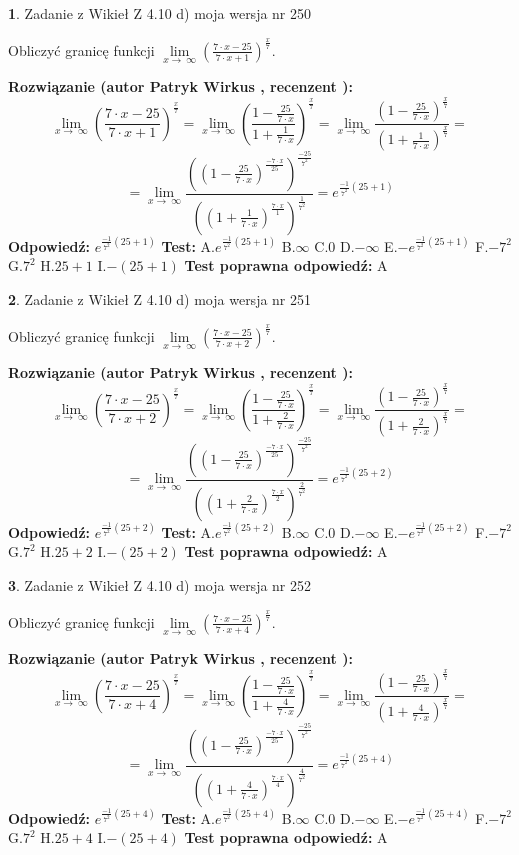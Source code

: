 \documentclass[12pt, a4paper]{article}
\theoremstyle{definition} %
\newtheorem{zad}{}
\newcommand{\zadStart}[1]{\begin{zad}#1\newline}
\newcommand{\zadStop}{\end{zad}}
\newcommand{\rozwStart}[2]{\noindent \textbf{Rozwiązanie (autor #1 , recenzent #2): }\newline}
\newcommand{\rozwStop}{\newline}
\newcommand{\odpStart}{\noindent \textbf{Odpowiedź:}\newline}
\newcommand{\odpStop}{\newline}
\newcommand{\testStart}{\noindent \textbf{Test:}\newline}
\newcommand{\testStop}{\newline}
\newcommand{\kluczStart}{\noindent \textbf{Test poprawna odpowiedź:}\newline}
\newcommand{\kluczStop}{\newline}
\begin{document}
\zadStart{Zadanie z Wikieł Z 4.10 d) moja wersja nr 250}


Obliczyć granicę funkcji  $\lim\limits_{x\to\ \infty}(\frac{7\cdot x-25}{7\cdot x+1})^{\frac{x}{7}}$.
\zadStop
\rozwStart{Patryk Wirkus}{}
$$\lim\limits_{x\to\ \infty}(\frac{7\cdot x-25}{7\cdot x+1})^{\frac{x}{7}} = \lim\limits_{x\to\ \infty}(\frac{1-\frac{25}{7\cdot x}}{1+\frac{1}{7\cdot x}})^{\frac{x}{7}}=\lim\limits_{x\to\ \infty}\frac{(1-\frac{25}{7\cdot x})^{\frac{x}{7}}}{(1+\frac{1}{7\cdot x})^{\frac{x}{7}}}=$$
$$=\lim\limits_{x\to\ \infty}\frac{((1-\frac{25}{7\cdot x})^{\frac{-7\cdot x}{25}})^{\frac{-25}{7^{2}}}}{((1+\frac{1}{7\cdot x})^{\frac{7\cdot x}{1}})^{\frac{1}{7^{2}}}}=e^{\frac{-1}{7^{2}}(25+1)}$$
\rozwStop
\odpStart
$e^{\frac{-1}{7^{2}}(25+1)}$
\odpStop
\testStart
A.$e^{\frac{-1}{7^{2}}(25+1)}$ B.$\infty$ C.$0$ D.$-\infty$ E.$-e^{\frac{-1}{7^{2}}(25+1)}$
F.$-7^{2}$ G.$7^{2}$
H.$25+1$
I.$-(25+1)$
\testStop
\kluczStart
A
\kluczStop



\zadStart{Zadanie z Wikieł Z 4.10 d) moja wersja nr 251}


Obliczyć granicę funkcji  $\lim\limits_{x\to\ \infty}(\frac{7\cdot x-25}{7\cdot x+2})^{\frac{x}{7}}$.
\zadStop
\rozwStart{Patryk Wirkus}{}
$$\lim\limits_{x\to\ \infty}(\frac{7\cdot x-25}{7\cdot x+2})^{\frac{x}{7}} = \lim\limits_{x\to\ \infty}(\frac{1-\frac{25}{7\cdot x}}{1+\frac{2}{7\cdot x}})^{\frac{x}{7}}=\lim\limits_{x\to\ \infty}\frac{(1-\frac{25}{7\cdot x})^{\frac{x}{7}}}{(1+\frac{2}{7\cdot x})^{\frac{x}{7}}}=$$
$$=\lim\limits_{x\to\ \infty}\frac{((1-\frac{25}{7\cdot x})^{\frac{-7\cdot x}{25}})^{\frac{-25}{7^{2}}}}{((1+\frac{2}{7\cdot x})^{\frac{7\cdot x}{2}})^{\frac{2}{7^{2}}}}=e^{\frac{-1}{7^{2}}(25+2)}$$
\rozwStop
\odpStart
$e^{\frac{-1}{7^{2}}(25+2)}$
\odpStop
\testStart
A.$e^{\frac{-1}{7^{2}}(25+2)}$ B.$\infty$ C.$0$ D.$-\infty$ E.$-e^{\frac{-1}{7^{2}}(25+2)}$
F.$-7^{2}$ G.$7^{2}$
H.$25+2$
I.$-(25+2)$
\testStop
\kluczStart
A
\kluczStop



\zadStart{Zadanie z Wikieł Z 4.10 d) moja wersja nr 252}


Obliczyć granicę funkcji  $\lim\limits_{x\to\ \infty}(\frac{7\cdot x-25}{7\cdot x+4})^{\frac{x}{7}}$.
\zadStop
\rozwStart{Patryk Wirkus}{}
$$\lim\limits_{x\to\ \infty}(\frac{7\cdot x-25}{7\cdot x+4})^{\frac{x}{7}} = \lim\limits_{x\to\ \infty}(\frac{1-\frac{25}{7\cdot x}}{1+\frac{4}{7\cdot x}})^{\frac{x}{7}}=\lim\limits_{x\to\ \infty}\frac{(1-\frac{25}{7\cdot x})^{\frac{x}{7}}}{(1+\frac{4}{7\cdot x})^{\frac{x}{7}}}=$$
$$=\lim\limits_{x\to\ \infty}\frac{((1-\frac{25}{7\cdot x})^{\frac{-7\cdot x}{25}})^{\frac{-25}{7^{2}}}}{((1+\frac{4}{7\cdot x})^{\frac{7\cdot x}{4}})^{\frac{4}{7^{2}}}}=e^{\frac{-1}{7^{2}}(25+4)}$$
\rozwStop
\odpStart
$e^{\frac{-1}{7^{2}}(25+4)}$
\odpStop
\testStart
A.$e^{\frac{-1}{7^{2}}(25+4)}$ B.$\infty$ C.$0$ D.$-\infty$ E.$-e^{\frac{-1}{7^{2}}(25+4)}$
F.$-7^{2}$ G.$7^{2}$
H.$25+4$
I.$-(25+4)$
\testStop
\kluczStart
A
\kluczStop
\end{document}
